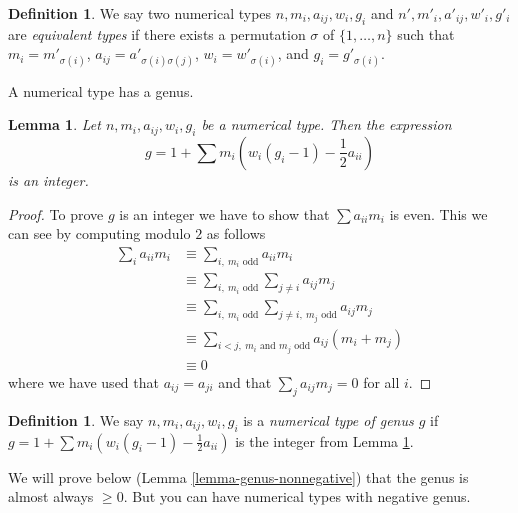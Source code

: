 \documentclass[10pt,a4paper]{amsart}
\theoremstyle{plain}
\newtheorem{lemma}[subsection]{Lemma}
\theoremstyle{definition}
\newtheorem{definition}[subsection]{Definition}
\theoremstyle{remark}
\numberwithin{equation}{subsection}
\begin{document}
\begin{definition}
\label{definition-type-equivalent}
We say two numerical types $n, m_i, a_{ij}, w_i, g_i$ and
$n', m'_i, a'_{ij}, w'_i, g'_i$ are {\it equivalent types} if
there exists a permutation $\sigma$ of $\{1, \ldots, n\}$
such that $m_i = m'_{\sigma(i)}$, $a_{ij} = a'_{\sigma(i)\sigma(j)}$,
$w_i = w'_{\sigma(i)}$, and $g_i = g'_{\sigma(i)}$.
\end{definition}

\noindent
A numerical type has a genus.

\begin{lemma}
\label{lemma-genus}
Let $n, m_i, a_{ij}, w_i, g_i$ be a numerical type. Then the expression
$$
g = 1 + \sum m_i(w_i(g_i - 1) - \frac{1}{2} a_{ii})
$$
is an integer.
\end{lemma}

\begin{proof}
To prove $g$ is an integer we have to show that $\sum a_{ii}m_i$ is even.
This we can see by computing modulo $2$ as follows
\begin{align*}
\sum\nolimits_i a_{ii} m_i 
& \equiv
\sum\nolimits_{i,\ m_i\text{ odd}} a_{ii}m_i \\
& \equiv
\sum\nolimits_{i,\ m_i\text{ odd}} \sum\nolimits_{j \not = i} a_{ij}m_j \\
& \equiv
\sum\nolimits_{i,\ m_i\text{ odd}}
\sum\nolimits_{j \not = i,\ m_j\text{ odd}} a_{ij}m_j \\
& \equiv
\sum\nolimits_{i < j,\ m_i\text{ and }m_j\text{ odd}} a_{ij}(m_i + m_j) \\
& \equiv
0
\end{align*}
where we have used that $a_{ij} = a_{ji}$ and that $\sum_j a_{ij}m_j = 0$
for all $i$.
\end{proof}

\begin{definition}
\label{definition-genus}
We say $n, m_i, a_{ij}, w_i, g_i$ is a {\it numerical type of genus $g$}
if $g = 1 + \sum m_i(w_i(g_i - 1) - \frac{1}{2} a_{ii})$ is the integer
from Lemma \ref{lemma-genus}.
\end{definition}

\noindent
We will prove below (Lemma \ref{lemma-genus-nonnegative}) that the genus
is almost always $\geq 0$. But you can have numerical types with
negative genus.
\end{document}
